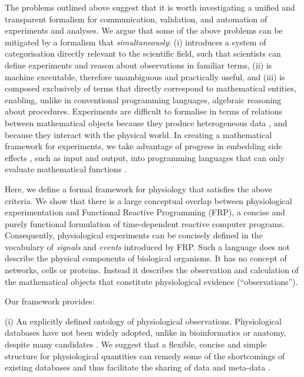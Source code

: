 The problems outlined above suggest that it is worth investigating a
unified and transparent formalism for communication, validation, and
automation of experiments and analyses. We argue that
some of the above problems can be mitigated by a formalism that
\emph{simultaneously}: (i) introduces a system of categorisation
directly relevant to the scientific field, such that scientists can
define experiments and reason about observations in familiar terms,
(ii) is machine executable, therefore unambiguous and practically
useful, and (iii) is composed exclusively of terms that directly
correspond to mathematical entities, enabling, unlike in conventional
programming languages, algebraic reasoning about procedures.
Experiments are difficult to formalise in terms of relations between
mathematical objects because they produce heterogeneous data
\cite{Tukey1962}, and because they interact with the physical
world. In creating a mathematical framework for experiments, we take
advantage of progress in embedding side effects \cite{PeytonJones2002,
  Roy2004, Wadler1995}, such as input and output, into programming
languages that can only evaluate mathematical functions
\cite{Church1941}.

Here, we define a formal framework for physiology
that satisfies the above criteria. We show that there
is a large conceptual overlap between physiological experimentation
and Functional Reactive Programming (FRP\cite{Elliott1997,
  Nilsson2002}), a concise and purely functional formulation of
time-dependent reactive computer programs. Consequently, physiological
experiments can be concisely defined in the vocabulary of
\emph{signals} and \emph{events} introduced by FRP. Such a language
does not describe the physical components of biological organisms. It
has no concept of networks, cells or proteins. Instead it describes
the observation and calculation of the mathematical objects that
constitute physiological evidence (``observations'').

Our framework provides:

(i) An explicitly defined ontology of physiological
observations. Physiological databases have not been widely
adopted\cite{Herz2008, Amari2002}, unlike in bioinformatics or
anatomy, despite many candidates \cite{Jessop2010, Teeters2008,
  Frishkoff2009, Katz2010}.  We suggest that a flexible, concise and
simple structure for physiological quantities can remedy some of the
shortcomings\cite{Gardner2005, Amari2002} of existing databases and
thus facilitate the sharing of data and meta-data \cite{Insel2003}.

